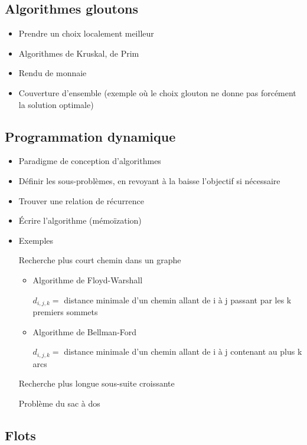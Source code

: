 \documentclass[10pt,a4paper]{article}
\begin{document}
\subsection{Algorithmes gloutons}

\begin{itemize}[noitemsep]
	\item Prendre un choix localement meilleur
	\item Algorithmes de Kruskal, de Prim
	\item Rendu de monnaie
	\item Couverture d'ensemble (exemple où le choix glouton ne donne pas forcément la solution optimale)
\end{itemize}


\subsection{Programmation dynamique}

\begin{itemize}[noitemsep]
	\item Paradigme de conception d'algorithmes
	\item Définir les sous-problèmes, en revoyant à la baisse l'objectif si nécessaire
	\item Trouver une relation de récurrence
	\item Écrire l'algorithme (mémoïzation)
	\item Exemples
	
		Recherche plus court chemin dans un graphe
		
	\begin{itemize}[noitemsep]
		\item Algorithme de Floyd-Warshall
		
		\( d_{i,j,k} = \) distance minimale d'un chemin allant de i à j %
		passant par les k premiers sommets 
		\item Algorithme de Bellman-Ford
		
		\( d_{i,j,k} = \) distance minimale d'un chemin allant de i à j %
		contenant au plus k arcs 
	\end{itemize}
		Recherche plus longue sous-suite croissante
		
		Problème du sac à dos
\end{itemize}


\subsection{Flots}
\end{document}
